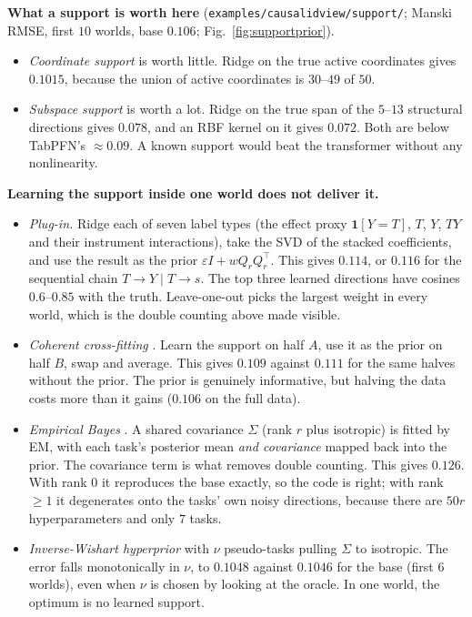 \documentclass[11pt]{article}
\theoremstyle{definition}
\theoremstyle{remark}
\begin{document}
\textbf{What a support is worth here} (\texttt{examples/causalidview/support/}; Manski RMSE, first $10$ worlds, base $0.106$; Fig.~\ref{fig:supportprior}).
\begin{itemize}
  \item \emph{Coordinate support} is worth little. Ridge on the true active coordinates gives $0.1015$, because the union of active coordinates is $30$--$49$ of $50$.
  \item \emph{Subspace support} is worth a lot. Ridge on the true span of the $5$--$13$ structural directions gives $0.078$, and an RBF kernel on it gives $0.072$. Both are below TabPFN's $\approx0.09$. A known support would beat the transformer without any nonlinearity.
\end{itemize}
\textbf{Learning the support inside one world does not deliver it.}
\begin{itemize}
  \item \emph{Plug-in.} Ridge each of seven label types (the effect proxy $\mathbf 1[Y=T]$, $T$, $Y$, $TY$ and their instrument interactions), take the SVD of the stacked coefficients, and use the result as the prior $\varepsilon I+wQ_rQ_r^\top$. This gives $0.114$, or $0.116$ for the sequential chain $T\to Y\!\mid\!T\to s$. The top three learned directions have cosines $0.6$--$0.85$ with the truth. Leave-one-out picks the largest weight in every world, which is the double counting above made visible.
  \item \emph{Coherent cross-fitting} \cite{chernozhukov18}. Learn the support on half $A$, use it as the prior on half $B$, swap and average. This gives $0.109$ against $0.111$ for the same halves without the prior. The prior is genuinely informative, but halving the data costs more than it gains ($0.106$ on the full data).
  \item \emph{Empirical Bayes} \cite{dempster77,tippingbishop99}. A shared covariance $\Sigma$ (rank $r$ plus isotropic) is fitted by EM, with each task's posterior mean \emph{and covariance} mapped back into the prior. The covariance term is what removes double counting. This gives $0.126$. With rank $0$ it reproduces the base exactly, so the code is right; with rank $\ge1$ it degenerates onto the tasks' own noisy directions, because there are $50r$ hyperparameters and only $7$ tasks.
  \item \emph{Inverse-Wishart hyperprior} with $\nu$ pseudo-tasks pulling $\Sigma$ to isotropic. The error falls monotonically in $\nu$, to $0.1048$ against $0.1046$ for the base (first $6$ worlds), even when $\nu$ is chosen by looking at the oracle. In one world, the optimum is no learned support.
\end{itemize}
\end{document}

